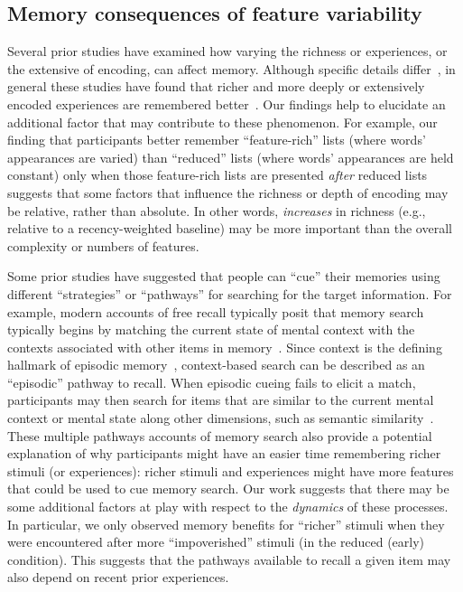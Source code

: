 \documentclass[11pt]{article}
\begin{document}

\subsection*{Memory consequences of feature variability}

Several prior studies have examined how varying the richness or experiences, or
the extensive of encoding, can affect memory. Although specific details
differ~\citep{BoniEtal22}, in general these studies have found that richer and
more deeply or extensively encoded experiences are remembered
better~\citep{HargEtal12, Mada21, MeinEtal20}. Our findings help to elucidate
an additional factor that may contribute to these phenomenon. For example, our
finding that participants better remember ``feature-rich'' lists (where words'
appearances are varied) than ``reduced'' lists (where words' appearances are
held constant) only when those feature-rich lists are presented \textit{after}
reduced lists suggests that some factors that influence the richness or depth
of encoding may be relative, rather than absolute. In other words,
\textit{increases} in richness (e.g., relative to a recency-weighted baseline)
may be more important than the overall complexity or numbers of features.

Some prior studies have suggested that people can ``cue'' their memories using
different ``strategies'' or ``pathways'' for searching for the target
information. For example, modern accounts of free recall typically posit that
memory search typically begins by matching the current state of mental context
with the contexts associated with other items in memory~\citep{Kaha20}. Since
context is the defining hallmark of episodic memory~\citep{Tulv83},
context-based search can be described as an ``episodic'' pathway to recall.
When episodic cueing fails to elicit a match, participants may then search for
items that are similar to the current mental context or mental state along
other dimensions, such as semantic similarity~\citep{DavaEtal03, SochEtal09}.
These multiple pathways accounts of memory search also provide a potential
explanation of why participants might have an easier time remembering richer
stimuli (or experiences): richer stimuli and experiences might have more
features that could be used to cue memory search. Our work suggests that there
may be some additional factors at play with respect to the \textit{dynamics} of
these processes. In particular, we only observed memory benefits for ``richer''
stimuli when they were encountered after more ``impoverished'' stimuli (in the
reduced (early) condition). This suggests that the pathways available to recall
a given item may also depend on recent prior experiences.
\end{document}
